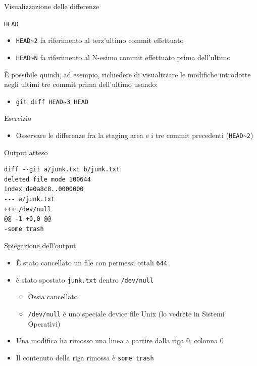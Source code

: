 \documentclass[presentation]{beamer}
\begin{document}
\begin{frame}{Visualizzazione delle differenze}
\begin{block}{\texttt{HEAD}}
\begin{itemize}
			\item \texttt{HEAD\textasciitilde{}2} fa riferimento al terz'ultimo commit effettuato
			\item \texttt{HEAD\textasciitilde{}N} fa riferimento al N-esimo commit effettuato prima dell'ultimo
		\end{itemize}
		È possibile quindi, ad esempio, richiedere di visualizzare le modifiche introdotte negli ultimi tre commit prima dell'ultimo usando:
		\begin{itemize}
			\item \texttt{git diff HEAD\textasciitilde{}3 HEAD}
		\end{itemize}
	\end{block}
	\begin{block}{Esercizio}	
		\begin{itemize}
			\item Osservare le differenze fra la staging area e i tre commit precedenti (\texttt{HEAD\textasciitilde{}2})
		\end{itemize}
	\end{block}
	\begin{block}{Output atteso}
		\begin{Verbatim}[fontsize=\scriptsize]
diff --git a/junk.txt b/junk.txt
deleted file mode 100644
index de0a8c8..0000000
--- a/junk.txt
+++ /dev/null
@@ -1 +0,0 @@
-some trash
		\end{Verbatim}
	\end{block}
		\begin{block}{Spiegazione dell'output}
		\begin{itemize}
			\item È stato cancellato un file con permessi ottali \texttt{644}
			\item è stato spostato \texttt{junk.txt} dentro \texttt{/dev/null}
			\begin{itemize}
				\item Ossia cancellato
				\item \texttt{/dev/null} è uno speciale device file Unix (lo vedrete in Sistemi Operativi)
			\end{itemize}
			\item Una modifica ha rimosso una linea a partire dalla riga 0, colonna 0
			\item Il contenuto della riga rimossa è \texttt{some trash}
		\end{itemize}
	\end{block}
\end{frame}
\end{document}
